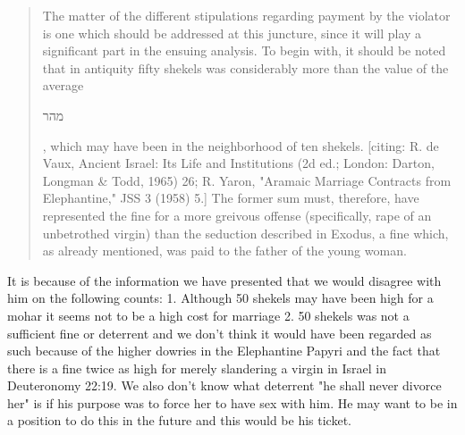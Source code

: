 \documentclass[11pt]{article}
\begin{document}
\begin{quote}
The matter of the different stipulations regarding payment by the violator is one which should be addressed at this juncture, since it will play a significant part in the ensuing analysis. To begin with, it should be noted that in antiquity fifty shekels was considerably more than the value of the average \begin{hebrew}מהר\end{hebrew}, which may have been in the neighborhood of ten shekels. [citing: R. de Vaux, Ancient Israel: Its Life and Institutions (2d ed.; London: Darton, Longman \& Todd, 1965) 26; R. Yaron, "Aramaic Marriage Contracts from Elephantine," JSS 3 (1958) 5.] The former sum must, therefore, have represented the fine for a more greivous offense (specifically, rape of an unbetrothed virgin) than the seduction described in Exodus, a fine which, as already mentioned, was paid to the father of the young woman.
\end{quote}


It is because of the information we have presented that we would disagree with him on the following counts: 1. Although 50 shekels may have been high for a mohar it seems not to be a high cost for marriage  2. 50 shekels was not a sufficient fine or deterrent and we don't think it would have been regarded as such because of the higher dowries in the Elephantine Papyri and the fact that there is a fine twice as high for merely slandering a virgin in Israel in Deuteronomy 22:19. We also don't know what deterrent "he shall never divorce her" is if his purpose was to force her to have sex with him. He may want to be in a position to do this in the future and this would be his ticket.
\end{document}
